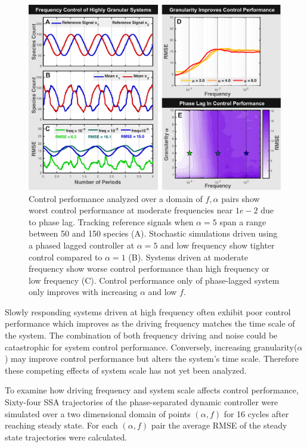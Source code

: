 \documentclass[12pt]{iopart}
\begin{document}
\begin{figure}
\begin{center}
\includegraphics[width=1\textwidth]{Frequency.pdf}
\vspace{-0.1in}
\caption{Control performance analyzed over a domain of $f,\alpha$ pairs show worst control performance at moderate frequencies near $1e-2$ due to phase lag. Tracking reference signals when $\alpha=5$ span a range between 50 and 150 species (A). Stochastic simulations driven using a phased lagged controller at $\alpha = 5$ and low frequency show tighter control compared to $\alpha =1$ (B). Systems driven at moderate frequency show worse control performance than high frequency or low frequency (C). Control performance only of phase-lagged system only improves with increasing $\alpha$ and low $f$.}
\label{CRG}
\end{center}
\vspace{-0.2in}
\end{figure}

Slowly responding systems driven at high frequency often exhibit poor control performance which improves as the driving frequency matches the time scale of the system.  The combination of both frequency driving and noise could be catastrophic for system control performance. Conversely, increasing granularity($\alpha$) may improve control performance but alters the system's time scale. Therefore these competing effects of system scale has not yet been analyzed.

To examine how driving frequency and system scale affects control performance, Sixty-four SSA trajectories of the phase-separated dynamic controller were simulated over a two dimensional domain of points $(\alpha,f)$ for 16 cycles after reaching steady state. For each $(\alpha,f)$ pair the average RMSE of the steady state trajectories were calculated.
\end{document}
